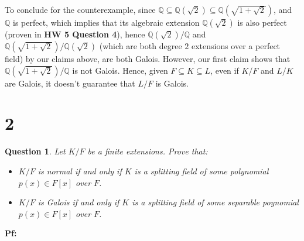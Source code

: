 \documentclass{article}
\newtheorem{question}{Question}
\begin{document}
\begin{itemize}
    To conclude for the counterexample, since $\mathbb{Q}\subseteq \mathbb{Q}(\sqrt{2})\subseteq \mathbb{Q}(\sqrt{1+\sqrt{2}})$, and $\mathbb{Q}$ is perfect, which implies that its algebraic extension $\mathbb{Q}(\sqrt{2})$ is also perfect (proven in \textbf{HW 5 Question 4}), hence $\mathbb{Q}(\sqrt{2})/\mathbb{Q}$ and $\mathbb{Q}(\sqrt{1+\sqrt{2}})/\mathbb{Q}(\sqrt{2})$ (which are both degree $2$ extensions over a perfect field) by our claims above, are both Galois.
    However, our first claim shows that $\mathbb{Q}(\sqrt{1+\sqrt{2}})/\mathbb{Q}$ is not Galois. Hence, given $F\subseteq K\subseteq L$, even if $K/F$ and $L/K$ are Galois, it doesn't guarantee that $L/F$ is Galois.
\end{itemize}

\hfil

\hfil

\section*{2}
\begin{myBox}[]{}
    \begin{question}
        Let $K/F$ be a finite extensions. Prove that:
        \begin{itemize}
            \item[(a)] $K/F$ is normal if and only if $K$ is a splitting field of some polynomial $p(x)\in F[x]$ over $F$.
            \item[(b)] $K/F$ is Galois if and only if $K$ is a splitting field of some separable poynomial $p(x)\in F[x]$ over $F$. 
        \end{itemize}
    \end{question}
\end{myBox}

\textbf{Pf:}
\end{document}
